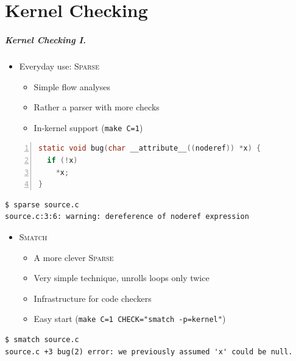 \documentclass[handout,xcolor=dvipsnames]{beamer}
\begin{document}
\part{Kernel Checking}

\begin{frame}
  \partpage
\end{frame}

\begin{frame}[fragile]
  \frametitle{Kernel Checking I.}
  \begin{itemize}
  \item[(1)] Everyday use: \textsc{Sparse}
  \begin{itemize}
  \item Simple flow analyses
  \item Rather a parser with more checks
  \item In-kernel support (\texttt{make C=1})
  \end{itemize}
  \end{itemize}

  \begin{lstlisting}[language=C,numbers=left,numbersep=2pt]
static void bug(char __attribute__((noderef)) *x) {
  if (!x)
    *x;
}
  \end{lstlisting}
  \begin{lstlisting}[language=XML]
$ sparse source.c
source.c:3:6: warning: dereference of noderef expression
  \end{lstlisting}

  \pause

  \begin{itemize}
  \item[(2)] \textsc{Smatch}
  \begin{itemize}
  \item A more clever \textsc{Sparse}
  \item Very simple technique, unrolls loops only twice
  \item Infrastructure for code checkers
  \item Easy start (\texttt{make C=1 CHECK="smatch -p=kernel"})
  \end{itemize}
  \end{itemize}

  \begin{lstlisting}[language=XML]
$ smatch source.c
source.c +3 bug(2) error: we previously assumed 'x' could be null.
  \end{lstlisting}

\end{frame}
\end{document}
